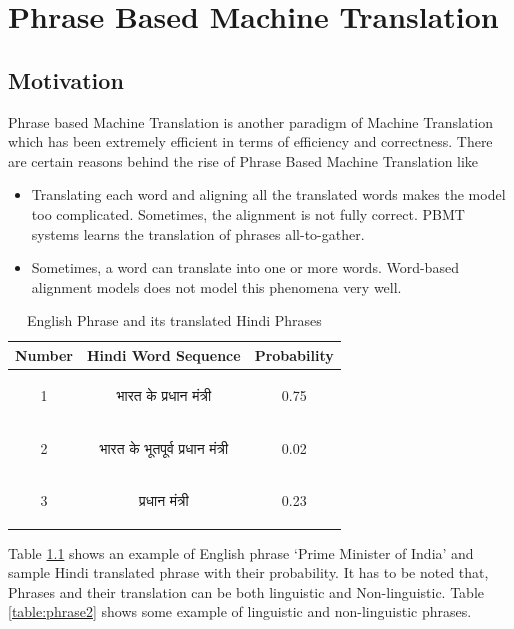 \chapter{Phrase Based Machine Translation}
\section{Motivation}
Phrase based Machine Translation is another paradigm of Machine Translation which has been extremely efficient in terms of efficiency and correctness. There are certain reasons behind the rise of Phrase Based Machine Translation like
\begin{itemize}
\item Translating each word and aligning all the translated words makes the model too complicated. Sometimes, the alignment is not fully correct. PBMT systems learns the translation of phrases all-to-gather.
\item Sometimes, a word can translate into one or more words. Word-based alignment models does not model this phenomena very well.
\end{itemize}
\begin{table}[!h]
\centering
	\caption{English Phrase and its translated Hindi Phrases}
    \label{table:phrase}
	\begin{tabular}{c c c}
    \hline
    Number & Hindi Word Sequence & Probability \\
    \hline
    1 & \begin{hindi} भारत के प्रधान मंत्री \end{hindi} & 0.75 \\
    2 & \begin{hindi} भारत के भूतपूर्व प्रधान मंत्री  \end{hindi} & 0.02 \\
    3 & \begin{hindi} प्रधान मंत्री \end{hindi} & 0.23 \\
    \hline
	\end{tabular}
\end{table}

Table \ref{table:phrase} shows an example\cite{bhattacharyya} of English phrase `Prime Minister of India' and sample Hindi translated phrase with their probability. It has to be noted that, Phrases and their translation can be both linguistic and Non-linguistic. Table \ref{table:phrase2} shows some example of linguistic and non-linguistic phrases. 

